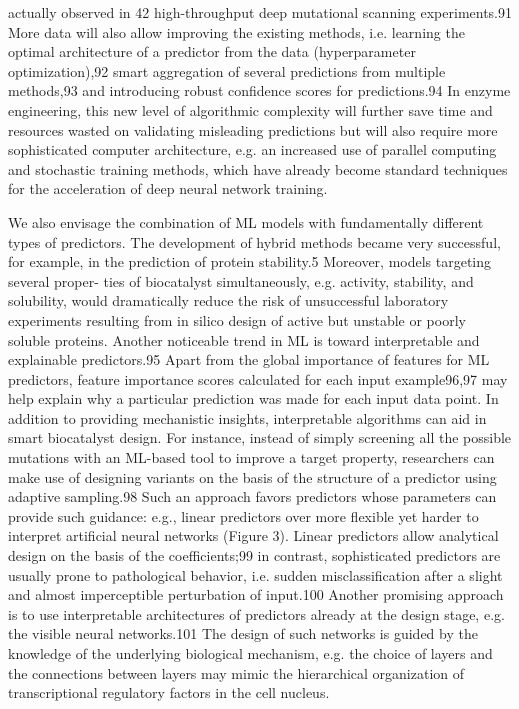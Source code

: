 \documentclass[12pt]{article}
\begin{document}
actually observed in 42 high-throughput deep mutational
scanning experiments.91 More data will also allow improving
the existing methods, i.e. learning the optimal architecture of a
predictor from the data (hyperparameter optimization),92
smart aggregation of several predictions from multiple
methods,93 and introducing robust conﬁdence scores for
predictions.94 In enzyme engineering, this new level of
algorithmic complexity will further save time and resources
wasted on validating misleading predictions but will also
require more sophisticated computer architecture, e.g. an
increased use of parallel computing and stochastic training
methods, which have already become standard techniques for
the acceleration of deep neural network training.

We also envisage
the combination of ML models with fundamentally diﬀerent
types of predictors. The development of hybrid methods
became very successful, for example, in the prediction of
protein stability.5 Moreover, models targeting several proper-
ties of biocatalyst simultaneously, e.g. activity, stability, and
solubility, would dramatically reduce the risk of unsuccessful
laboratory experiments resulting from in silico design of active
but unstable or poorly soluble proteins.
Another noticeable trend in ML is toward interpretable and
explainable predictors.95 Apart from the global importance of
features for ML predictors, feature importance scores
calculated for each input example96,97 may help explain why
a particular prediction was made for each input data point. In
addition to providing mechanistic insights, interpretable
algorithms can aid in smart biocatalyst design. For instance,
instead of simply screening all the possible mutations with an
ML-based tool to improve a target property, researchers can
make use of designing variants on the basis of the structure of a
predictor using adaptive sampling.98 Such an approach favors
predictors whose parameters can provide such guidance: e.g.,
linear predictors over more ﬂexible yet harder to interpret
artiﬁcial neural networks (Figure 3). Linear predictors allow
analytical design on the basis of the coeﬃcients;99 in contrast,
sophisticated predictors are usually prone to pathological
behavior, i.e. sudden misclassiﬁcation after a slight and almost
imperceptible perturbation of input.100
Another promising approach is to use interpretable
architectures of predictors already at the design stage, e.g.
the visible neural networks.101 The design of such networks is
guided by the knowledge of the underlying biological
mechanism, e.g. the choice of layers and the connections
between layers may mimic the hierarchical organization of
transcriptional regulatory factors in the cell nucleus.
\end{document}
